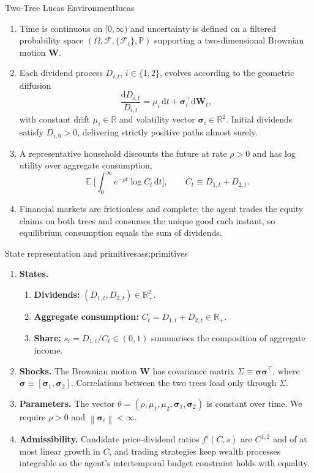 ﻿\documentclass[11pt,letterpaper,oneside]{article}
\numberwithin{equation}{section}
\DeclareMathOperator{\E}{\mathbb{E}}
\newcommand{\R}{\mathbb{R}}
\newcommand{\1}{\mathbf{1}}
\newcommand{\diff}{\mathrm{d}}
\newcommand{\norm}[1]{\left\lVert #1\right\rVert}
\begin{document}
\begin{assumption}{Two-Tree Lucas Environment}{lucas}
\begin{enumerate}[leftmargin=1.25em]
  \item Time is continuous on $[0,\infty)$ and uncertainty is defined on a filtered probability space $(\Omega,\mathcal F,\{\mathcal F_t\},\mathbb P)$ supporting a two-dimensional Brownian motion $\bm W$.
  \item Each dividend process $D_{i,t}$, $i\in\{1,2\}$, evolves according to the geometric diffusion
  \begin{equation}\label{eq:dividend}
    \frac{\diff D_{i,t}}{D_{i,t}} = \mu_i\,\diff t + \bm{\sigma}_i^{\top}\diff \bm W_t,
  \end{equation}
  with constant drift $\mu_i\in\R$ and volatility vector $\bm\sigma_i\in\R^2$. Initial dividends satisfy $D_{i,0}>0$, delivering strictly positive paths almost surely.
  \item A representative household discounts the future at rate $\rho>0$ and has log utility over aggregate consumption, 
  \[
    \E\bigg[\int_0^{\infty} e^{-\rho t}\log C_t\,\diff t\bigg], \qquad C_t \equiv D_{1,t}+D_{2,t}.
  \]
  \item Financial markets are frictionless and complete: the agent trades the equity claims on both trees and consumes the unique good each instant, so equilibrium consumption equals the sum of dividends.
\end{enumerate}
\end{assumption}


\begin{assumption}{State representation and primitives}{ass:primitives}
\begin{enumerate}[label=(\roman*),itemsep=0.25em]
  \item \textbf{States.}
  \begin{enumerate}[label=\alph*)]
    \item \textbf{Dividends:} $(D_{1,t},D_{2,t})\in\R_+^2$.
    \item \textbf{Aggregate consumption:} $C_t=D_{1,t}+D_{2,t} \in \R_+$.
    \item \textbf{Share:} $s_t=D_{1,t}/C_t \in (0,1)$ summarises the composition of aggregate income.
  \end{enumerate}
  \item \textbf{Shocks.} The Brownian motion $\bm W$ has covariance matrix $\Sigma\equiv \bm\sigma\bm\sigma^{\top}$, where $\bm\sigma\equiv[\bm\sigma_1,\bm\sigma_2]$. Correlations between the two trees load only through $\Sigma$.
  \item \textbf{Parameters.} The vector $\theta=(\rho,\mu_1,\mu_2,\bm\sigma_1,\bm\sigma_2)$ is constant over time. We require $\rho>0$ and $\norm{\bm\sigma_i}<\infty$.
  \item \textbf{Admissibility.} Candidate price-dividend ratios $f^i(C,s)$ are $C^{1,2}$ and of at most linear growth in $C$, and trading strategies keep wealth processes integrable so the agent's intertemporal budget constraint holds with equality.
\end{enumerate}
\end{assumption}
\end{document}
